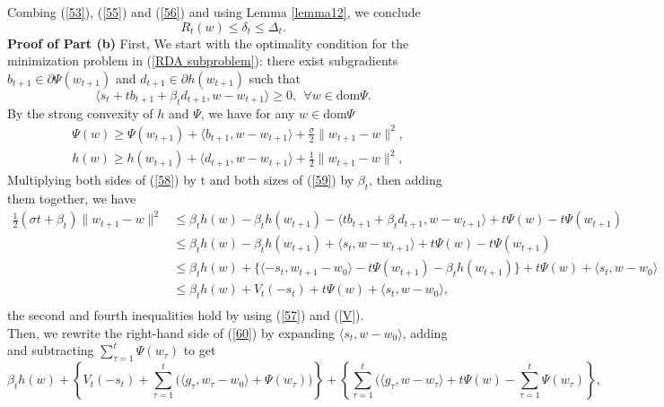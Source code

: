 Combing (\ref{53}), (\ref{55}) and (\ref{56}) and using Lemma \ref{lemma12}, we conclude
$$
R_t(w)\leq \delta_t\leq \Delta_t.
$$
\textbf{Proof of Part (b)} First, We start with the optimality condition for the minimization problem in (\ref{RDA subproblem}): there exist subgradients $b_{t+1}\in \partial \Psi(w_{t+1})$ and $d_{t+1}\in \partial h(w_{t+1})$ such that
\begin{equation}\label{57}
	\langle s_t+tb_{t+1}+\beta_t d_{t+1},w-w_{t+1} \rangle \geq 0,~~ \forall w\in \text{dom} \Psi.
\end{equation}
By the strong convexity of $h$ and $\Psi$, we have for any $w\in \text{dom} \Psi$
\begin{align}
	&\Psi(w) \geq \Psi(w_{t+1})+\langle b_{t+1},w-w_{t+1} \rangle+\frac{\sigma}{2} \|w_{t+1}-w\|^2,\label{58}\\
	&h(w) \geq h(w_{t+1})+\langle d_{t+1},w-w_{t+1} \rangle+\frac{1}{2} \|w_{t+1}-w\|^2,\label{59}
\end{align}
Multiplying both sides of (\ref{58}) by t and both sizes of (\ref{59}) by $\beta_t$, then adding them together, we have
\begin{equation}\label{60}
	\begin{split}
		\frac{1}{2}(\sigma t+\beta_t)\|w_{t+1}-w\|^2 
		&\leq \beta_t h(w)-\beta_t h(w_{t+1})-\langle tb_{t+1}+\beta_t d_{t+1},w-w_{t+1} \rangle +t\Psi(w)-t\Psi(w_{t+1})\\
		&\leq \beta_t h(w)-\beta_t h(w_{t+1})+\langle s_t,w-w_{t+1} \rangle +t\Psi(w)-t\Psi(w_{t+1})\\
		&\leq \beta_t h(w)+\{\langle -s_t,w_{t+1}-w_0 \rangle -t\Psi(w_{t+1})-\beta_t h(w_{t+1})\} +t\Psi(w)+\langle s_t,w-w_0 \rangle\\
		&\leq \beta_t h(w)+V_t(-s_t) +t\Psi(w)+\langle s_t,w-w_0 \rangle,\\
	\end{split}
\end{equation}
the second and fourth inequalities hold by using (\ref{57}) and (\ref{V}).\\
Then, we rewrite the right-hand side of (\ref{60}) by expanding $\langle s_t,w-w_0 \rangle$, adding and subtracting $\sum\limits_{\tau =1}^{t}\Psi(w_{\tau})$ to get
\begin{equation*}
	\beta_t h(w)+ \left\{ V_t(-s_t)+ \sum\limits_{\tau =1}^{t}\big( \langle g_{\tau} ,w_{\tau}-w_0\rangle +\Psi(w_{\tau}) \big) \right\}  
	+\left\{ \sum\limits_{\tau =1}^{t}\big( \langle g_{\tau} , w - w_{\tau}\rangle +t\Psi(w)-\sum\limits_{\tau =1}^{t}\Psi(w_{\tau}) \right\},
\end{equation*}
